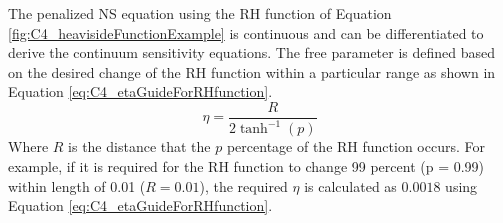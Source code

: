 %
The penalized NS equation using the RH function of Equation \eqref{fig:C4_heavisideFunctionExample} is continuous and can be differentiated to derive the continuum sensitivity equations. The free parameter is defined based on the desired change of the RH function within a particular range as shown in Equation \eqref{eq:C4_etaGuideForRHfunction}.
%
\begin{equation}\label{eq:C4_etaGuideForRHfunction}
    \eta = \frac{R}{2 \tanh^{-1} (p)}
\end{equation}
%
Where $R$ is the distance that the $p$ percentage of the RH function occurs. For example, if it is required for the RH function to change 99 percent (p = 0.99) within length of 0.01 ($R = 0.01$), the required $\eta$ is calculated as $0.0018$ using Equation \eqref{eq:C4_etaGuideForRHfunction}.

